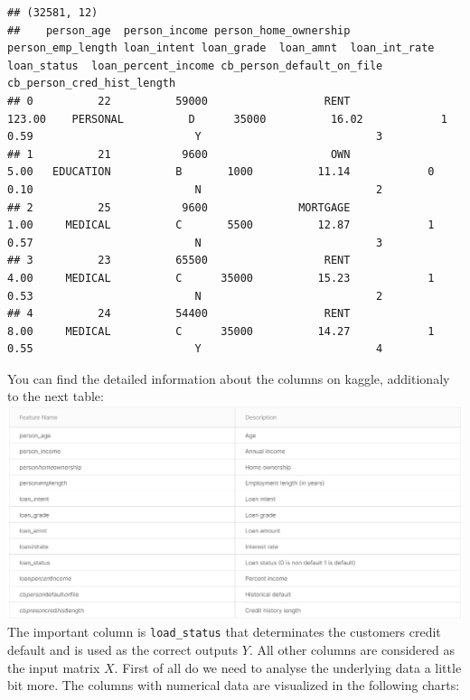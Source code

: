 \documentclass[
]{book}
\begin{document}
\begin{verbatim}
## (32581, 12)
##    person_age  person_income person_home_ownership  person_emp_length loan_intent loan_grade  loan_amnt  loan_int_rate  loan_status  loan_percent_income cb_person_default_on_file  cb_person_cred_hist_length
## 0          22          59000                  RENT             123.00    PERSONAL          D      35000          16.02            1                 0.59                         Y                           3
## 1          21           9600                   OWN               5.00   EDUCATION          B       1000          11.14            0                 0.10                         N                           2
## 2          25           9600              MORTGAGE               1.00     MEDICAL          C       5500          12.87            1                 0.57                         N                           3
## 3          23          65500                  RENT               4.00     MEDICAL          C      35000          15.23            1                 0.53                         N                           2
## 4          24          54400                  RENT               8.00     MEDICAL          C      35000          14.27            1                 0.55                         Y                           4
\end{verbatim}

You can find the detailed information about the columns on kaggle, additionaly to the next table:\\
\includegraphics[width=1\textwidth,height=\textheight]{./img/credit_default_kaggle_data_info.png}
The important column is \texttt{load\_status} that determinates the customers credit default and is used as the correct outputs \(Y\). All other columns are considered as the input matrix \(X\). First of all do we need to analyse the underlying data a little bit more. The columns with numerical data are visualized in the following charts:
\end{document}

